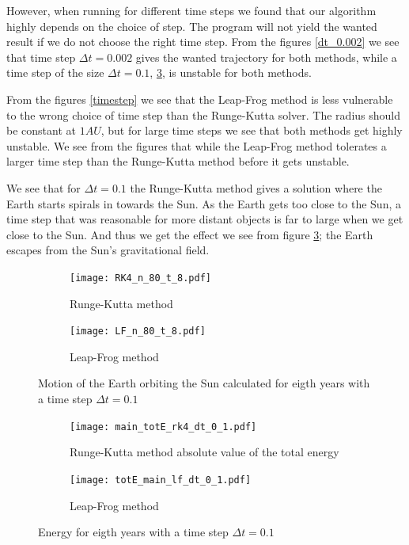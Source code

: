 \documentclass[a4paper,12pt, english]{article}
\begin{document}
However, when running for different time steps we found that our algorithm highly depends on the choice of step. The program will not yield the wanted result if we do not choose the right time step. From the figures \ref{dt_0.002} we see that time step $\Delta t = 0.002$ gives the wanted trajectory for both methods, while a time step of the size $\Delta t = 0.1$, \ref{dt0.1}, is unstable for both methods.

From the figures \ref{timestep} we see that the Leap-Frog method is less vulnerable to the wrong choice of time step than the Runge-Kutta solver. The radius should be constant at $1 AU$, but for large time steps we see that both methods get highly unstable. We see from the figures that while the Leap-Frog method tolerates a larger time step than the Runge-Kutta method before it gets unstable.


We see that for $\Delta t = 0.1$ the Runge-Kutta method gives a solution where the Earth starts spirals in towards the Sun. As the Earth gets too close to the Sun, a time step that was reasonable for more distant objects is far to large when we get close to the Sun. And thus we get the effect we see from figure \ref{dt0.1}; the Earth escapes from the Sun's gravitational field.

        
\begin{figure}
        \centering
        \begin{subfigure}[b]{0.6\textwidth}
                \texttt{[image: RK4\_n\_80\_t\_8.pdf]}
                \caption{Runge-Kutta method}
                \label{fig:RK4_dt_0.1}
        \end{subfigure}%
        
        \begin{subfigure}[b]{0.6\textwidth}
                \texttt{[image: LF\_n\_80\_t\_8.pdf]}
                \caption{Leap-Frog method}
                \label{fig:LF_dt_0.1}
        \end{subfigure}
        \caption{Motion of the Earth orbiting the Sun calculated for eigth years with a time step $\Delta t = 0.1$}
\label{dt0.1}
\end{figure}

\begin{figure}
        \centering
        \begin{subfigure}[b]{0.6\textwidth}
                \texttt{[image: main\_totE\_rk4\_dt\_0\_1.pdf]}
                \caption{Runge-Kutta method absolute value of the total energy}
                \label{fig:RK4_dt_0.1}
        \end{subfigure}%
       
        \begin{subfigure}[b]{0.8\textwidth}
                \texttt{[image: totE\_main\_lf\_dt\_0\_1.pdf]}
                \caption{Leap-Frog method}
                \label{fig:LF_dt_0.1}
        \end{subfigure}
        \caption{Energy for eigth years with a time step $\Delta t = 0.1$}
    
\end{figure}
\end{document}
